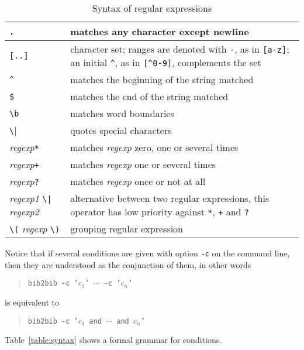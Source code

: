 \documentclass[11pt,a4paper]{article}
\begin{document}
\begin{table}
\begin{center}
\begin{tabular}{|l|p{100mm}|}
\hline
\verb|.| & matches any character except newline \\\hline
\verb|[..]| & character set; ranges are denoted with \verb|-|, as in
\verb|[a-z]|; an initial \verb|^|, as in \verb|[^0-9]|, complements
the set \\\hline 
\verb|^| & matches the beginning of the string matched \\\hline
\verb|$| & matches the end of the string matched \\\hline
\verb|\b| & matches word boundaries \\\hline
\verb|\| & quotes special characters \\\hline
\textsl{regexp}\verb|*| & matches \textsl{regexp} zero, one or several
times \\\hline 
\textsl{regexp}\verb|+| & matches \textsl{regexp} one or several times
\\\hline 
\textsl{regexp}\verb|?| & matches \textsl{regexp} once or not at all \\\hline
\textsl{regexp1} \verb+\|+ \textsl{regexp2} & alternative between two
regular expressions, this operator has low priority against
\verb|*|, \verb|+| and \verb|?| \\\hline
\verb|\(| \textsl{regexp} \verb|\)| & grouping regular expression \\\hline
\end{tabular} 
\end{center}
\caption{Syntax of regular expressions}
\label{table:regexp}
\end{table}

Notice that if several conditions are given with option \verb|-c| on
the command line, then they are understood as the conjunction of them,
in other words
\begin{quote}
\texttt{bib2bib -c '$c_1$' $\cdots$ -c '$c_n$'}
\end{quote} 
is equivalent to
\begin{quote}
\texttt{bib2bib -c '$c_1$ and $\cdots$ and $c_n$'}
\end{quote} 

Table~\ref{table:syntax} shows a formal grammar for conditions.
\end{document}
